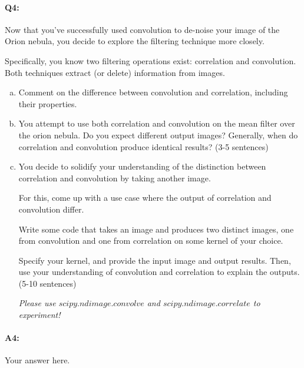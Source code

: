 
\pagebreak
\paragraph{Q4:} Now that you've successfully used convolution to de-noise your image of the Orion nebula, you decide to explore the filtering technique more closely. 

Specifically, you know two filtering operations exist: correlation and convolution. Both techniques extract (or delete) information from images.

\begin{enumerate}[(a)]
    \item Comment on the difference between convolution and correlation, including their properties. 
    
    \item You attempt to use both correlation and convolution on the mean filter over the orion nebula. Do you expect different output images? Generally, when do correlation and convolution produce identical results? (3-5 sentences)

    \item
    You decide to solidify your understanding of the distinction between correlation and convolution by taking another image.
    
    For this, come up with a use case where the output of correlation and convolution differ.
    
    Write some code that takes an image and produces two distinct images, one from convolution and one from correlation on some kernel of your choice. 
    
    Specify your kernel, and provide the input image and output results. Then, use your understanding of convolution and correlation to explain the outputs. (5-10 sentences)

    \emph{Please use \href{https://docs.scipy.org/doc/scipy/reference/generated/scipy.ndimage.convolve.html}{$scipy.ndimage.convolve$} and \href{https://docs.scipy.org/doc/scipy/reference/generated/scipy.ndimage.correlate.html}{$scipy.ndimage.correlate$} to experiment!}

\end{enumerate}


\paragraph{A4:} Your answer here.

